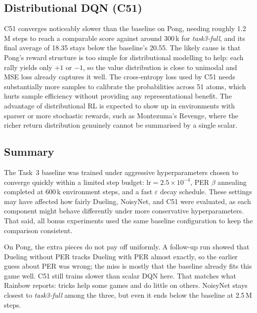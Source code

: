 \documentclass[12pt,a4paper]{report}
\begin{document}
\subsection{Distributional DQN (C51)}
C51 converges noticeably slower than the baseline on Pong,
needing roughly 1.2\,M steps to reach a comparable score against around 300\,k for
\textit{task3-full}, and its final average of 18.35 stays below the baseline's 20.55.
The likely cause is that Pong's reward structure is too simple for distributional
modelling to help: each rally yields only $+1$ or $-1$, so the value distribution
is close to unimodal and MSE loss already captures it well.
The cross-entropy loss used by C51 needs substantially more samples to calibrate the
probabilities across 51 atoms, which hurts sample efficiency without providing any
representational benefit.
The advantage of distributional RL is expected to show up in environments with
sparser or more stochastic rewards, such as Montezuma's Revenge, where the richer
return distribution genuinely cannot be summarised by a single scalar.

\subsection{Summary}
The Task~3 baseline was trained under aggressive hyperparameters chosen to converge
quickly within a limited step budget: $\text{lr} = 2.5\times10^{-4}$, PER $\beta$
annealing completed at 600\,k environment steps, and a fast $\varepsilon$ decay schedule.
These settings may have affected how fairly Dueling, NoisyNet, and C51 were evaluated,
as each component might behave differently under more conservative hyperparameters.
That said, all bonus experiments used the same baseline configuration to keep the
comparison consistent.

On Pong, the extra pieces do not pay off uniformly. A follow-up run showed that Dueling
without PER tracks Dueling with PER almost exactly, so the earlier guess about PER was
wrong; the miss is mostly that the baseline already fits this game well. C51 still trains
slower than scalar DQN here. That matches what Rainbow reports: tricks help some games and
do little on others. NoisyNet stays closest to \textit{task3-full} among the three, but even
it ends below the baseline at 2.5\,M steps.
\end{document}
